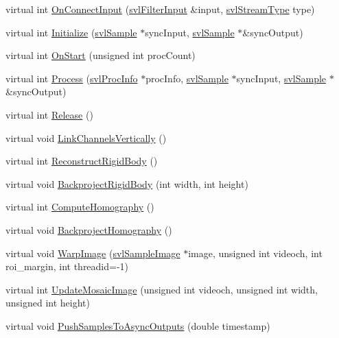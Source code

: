 \begin{DoxyCompactItemize}
\item 
virtual int \hyperlink{classsvl_filter_image_tracker_aa56041f1f99e38c95e376fd4d86308e4}{On\-Connect\-Input} (\hyperlink{classsvl_filter_input}{svl\-Filter\-Input} \&input, \hyperlink{svl_definitions_8h_aa00696d338a58db361335a01fd11e122}{svl\-Stream\-Type} type)
\item 
virtual int \hyperlink{classsvl_filter_image_tracker_ae0c8005cdb37e4e23cedc872bcd0083b}{Initialize} (\hyperlink{classsvl_sample}{svl\-Sample} $\ast$sync\-Input, \hyperlink{classsvl_sample}{svl\-Sample} $\ast$\&sync\-Output)
\item 
virtual int \hyperlink{classsvl_filter_image_tracker_a4c02386dc5a53c4dc91cc366e0db88da}{On\-Start} (unsigned int proc\-Count)
\item 
virtual int \hyperlink{classsvl_filter_image_tracker_a5ddf75bff8a2ece8088f8535902d4311}{Process} (\hyperlink{structsvl_proc_info}{svl\-Proc\-Info} $\ast$proc\-Info, \hyperlink{classsvl_sample}{svl\-Sample} $\ast$sync\-Input, \hyperlink{classsvl_sample}{svl\-Sample} $\ast$\&sync\-Output)
\item 
virtual int \hyperlink{classsvl_filter_image_tracker_aad53f8b2ca1d2ba142d16b20ce10f7b2}{Release} ()
\item 
virtual void \hyperlink{classsvl_filter_image_tracker_a4d177432be2507264815d7bf4adec2a9}{Link\-Channels\-Vertically} ()
\item 
virtual int \hyperlink{classsvl_filter_image_tracker_aa52ae2fdec977aa7963c827405dc04f2}{Reconstruct\-Rigid\-Body} ()
\item 
virtual void \hyperlink{classsvl_filter_image_tracker_a6313371f45e2957035d4dd0ea0f042e6}{Backproject\-Rigid\-Body} (int width, int height)
\item 
virtual int \hyperlink{classsvl_filter_image_tracker_a1600c61731583046c9c7f79787e9017b}{Compute\-Homography} ()
\item 
virtual void \hyperlink{classsvl_filter_image_tracker_af97819e1b561eea75a255e2cfaf7ca78}{Backproject\-Homography} ()
\item 
virtual void \hyperlink{classsvl_filter_image_tracker_a199267feba07bc2ce085f87e8e35baa8}{Warp\-Image} (\hyperlink{classsvl_sample_image}{svl\-Sample\-Image} $\ast$image, unsigned int videoch, int roi\-\_\-margin, int threadid=-\/1)
\item 
virtual int \hyperlink{classsvl_filter_image_tracker_a121c3db787aea79abc62f0b94fd8bb84}{Update\-Mosaic\-Image} (unsigned int videoch, unsigned int width, unsigned int height)
\item 
virtual void \hyperlink{classsvl_filter_image_tracker_af773685cda7ce9b38a390ba82daebde0}{Push\-Samples\-To\-Async\-Outputs} (double timestamp)
\end{DoxyCompactItemize}
